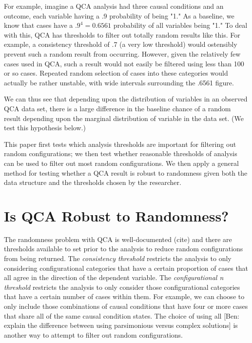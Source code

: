 \documentclass[]{article}
\begin{document}
For example, imagine a QCA analysis had three causal conditions and an outcome, each variable having a .9 probability of being "1." As a baseline, we know that cases have a $.9^4 = 0.6561$ probability of all variables being "1." To deal with this, QCA has thresholds to filter out totally random results like this. For example, a consistency threshold of .7 (a very low threshold) would ostensibly prevent such a random result from occurring. However, given the relatively few cases used in QCA, such a result would not easily be filtered using less than 100 or so cases. Repeated random selection of cases into these categories would actually be rather unstable, with wide intervals surrounding the .6561 figure. 





We can thus see that depending upon the distribution of variables in an observed QCA data set, there is a large difference in the baseline chance of a random result depending upon the marginal distribution of variable in the data set. (We test this hypothesis below.)




This paper first tests which analysis thresholds are important for filtering out random configurations; we then test whether reasonable thresholds of analysis can be used to filter out most random configurations. We then apply a general method for testing whether a QCA result is robust to randomness given both the data structure and the thresholds chosen by the researcher. 


\section{Is QCA Robust to Randomness?}


The randomness problem with QCA is well-documented (cite) and there are thresholds available to set prior to the analysis to reduce random configurations from being returned. The \emph{consistency threshold} restricts the analysis to only considering configurational categories that have a certain proportion of cases that all agree in the direction of the dependent variable. The \emph{configurational n threshold} restricts the analysis to only consider those configurational categories that have a certain number of cases within them. For example, we can choose to only include those combinations of causal conditions that have four or more cases that share all of the same causal condition states. The choice of using all [Ben: explain the difference between using parsimonious versus complex solutions] is another way to attempt to filter out random configurations.
\end{document}
